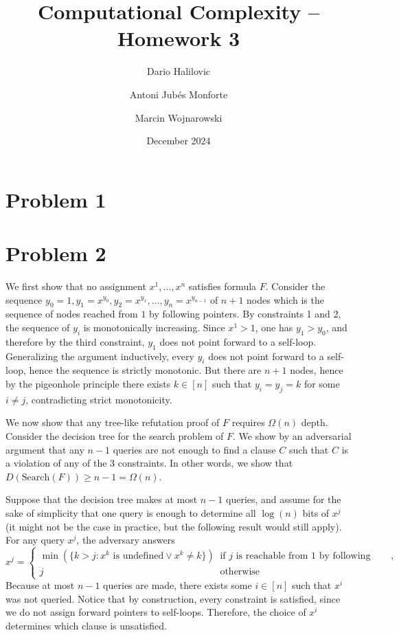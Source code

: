 \documentclass{article}
\title{Computational Complexity -- Homework 3}
\author{Dario Halilovic\and
Antoni Jubés Monforte\and
Marcin Wojnarowski}
\date{December 2024}
\begin{document}
\maketitle

\section*{Problem 1}

\section*{Problem 2}

We first show that no assignment $x^{1}, \ldots, x^{n}$
satisfies formula $F$. Consider the sequence $y_0 = 1, y_1 = x^{y_0}, y_2
= x^{y_1}, \ldots, y_{n} = x^{y_{n-1}}$ of $n+1$ nodes which is the sequence of
nodes reached from $1$ by following pointers. By constraints 1 and 2, the
sequence of $y_i$ is monotonically increasing. Since $x^1 > 1$, one has $y_1
> y_0$, and therefore by the third constraint, $y_1$ does not point forward to
a self-loop. Generalizing the argument inductively, every $y_i$ does not point
forward to a self-loop, hence the sequence is strictly monotonic. But there are
$n+1$ nodes, hence by the pigeonhole principle there exists $k \in [n]$ such
that $y_i = y_j = k$ for some $i \neq j$, contradicting strict monotonicity.

We now show that any tree-like refutation proof of $F$ requires $\Omega(n)$
depth. Consider the decision tree for the search problem of $F$. We show by an
adversarial argument that any $n - 1$ queries are not enough to find a clause
$C$ such that $C$ is a violation of any of the 3 constraints. In other words, we
show that $D(\textrm{Search}(F)) \geq n - 1 = \Omega(n)$.

Suppose that the decision tree makes at most $n - 1$ queries, and assume for the
sake of simplicity that one query is enough to determine all $\log(n)$ bits of
$x^j$ (it might not be the case in practice, but the following result would
still apply). For any query $x^{j}$, the adversary answers
\[
x^j = \begin{cases}
	\min(\{k > j : x^k \textrm{ is undefined} \lor x^k \neq k\}) & \textrm{if
	} j \textrm{ is reachable from 1 by following pointers}, \\
	j & \textrm{otherwise}
\end{cases}
\]
Because at most $n - 1$ queries are made, there exists some $i \in [n]$ such
that $x^i$ was not queried. Notice that by construction, every constraint is
satisfied, since we do not assign forward pointers to self-loops. Therefore, the
choice of $x^i$ determines which clause is unsatisfied.
\end{document}
